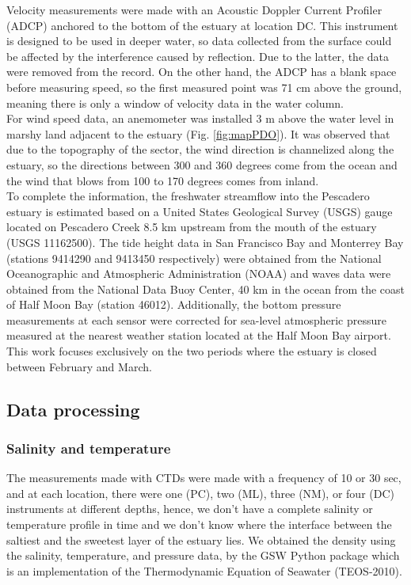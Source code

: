 \documentclass[11pt,letterpaper]{article}
\begin{document}
Velocity measurements were made with an Acoustic Doppler Current Profiler (ADCP) anchored to the bottom of the estuary at location DC. This instrument is designed to be used in deeper water, so data collected from the surface could be affected by the interference caused by reflection. Due to the latter, the data were removed from the record. On the other hand, the ADCP has a blank space before measuring speed, so the first measured point was 71 cm above the ground, meaning there is only a window of velocity data in the water column. \\

For wind speed data, an anemometer was installed 3 m above the water level in marshy land adjacent to the estuary (Fig. \ref{fig:mapPDO}). It was observed that due to the topography of the sector, the wind direction is channelized along the estuary, so the directions between 300 and 360 degrees come from the ocean and the wind that blows from 100 to 170 degrees comes from inland.\\

To complete the information, the freshwater streamflow into the Pescadero estuary is estimated based on a United States Geological Survey (USGS) gauge located on Pescadero Creek 8.5 km upstream from the mouth of the estuary (USGS 11162500). The tide height data in San Francisco Bay and Monterrey Bay (stations 9414290 and 9413450 respectively) were obtained from the National Oceanographic and Atmospheric Administration (NOAA) and waves data were obtained from the National Data Buoy Center, 40 km in the ocean from the coast of Half Moon Bay (station 46012). Additionally, the bottom pressure measurements at each sensor were corrected for sea-level atmospheric pressure measured at the nearest weather station located at the Half Moon Bay airport. This work focuses exclusively on the two periods where the estuary is closed between February and March.\\

\subsection{Data processing}

\subsubsection{Salinity and temperature}

The measurements made with CTDs were made with a frequency of 10 or 30 sec, and at each location, there were one (PC), two (ML), three (NM), or four (DC) instruments at different depths, hence, we don't have a complete salinity or temperature profile in time and we don't know where the interface between the saltiest and the sweetest layer of the estuary lies. We obtained the density using the salinity, temperature, and pressure data, by the GSW Python package which is an implementation of the Thermodynamic Equation of Seawater (TEOS-2010).\\
\end{document}
